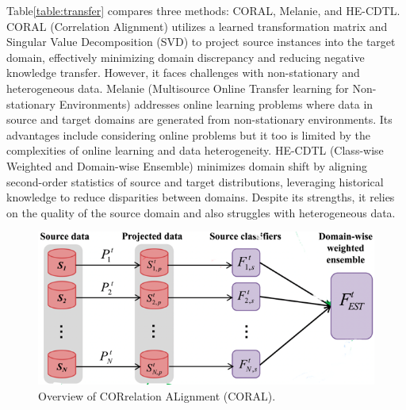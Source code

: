 Table\ref{table:transfer} compares three methods: CORAL, Melanie, and HE-CDTL. CORAL (Correlation Alignment) utilizes a learned transformation matrix and Singular Value Decomposition (SVD) to project source instances into the target domain, effectively minimizing domain discrepancy and reducing negative knowledge transfer. However, it faces challenges with non-stationary and heterogeneous data. Melanie (Multisource Online Transfer learning for Non-stationary Environments) addresses online learning problems where data in source and target domains are generated from non-stationary environments. Its advantages include considering online problems but it too is limited by the complexities of online learning and data heterogeneity. HE-CDTL (Class-wise Weighted and Domain-wise Ensemble) minimizes domain shift by aligning second-order statistics of source and target distributions, leveraging historical knowledge to reduce disparities between domains. Despite its strengths, it relies on the quality of the source domain and also struggles with heterogeneous data.
\begin{figure}[!ht]

    \begin{center}
        \includegraphics[width=.80\textwidth]{3_State-of-the-art/fig/coral.png} 
    \end{center}
    \caption{Overview of CORrelation ALignment (CORAL)\cite{sun2016return}.}
    \label{coral_fig}
    \end{figure}
